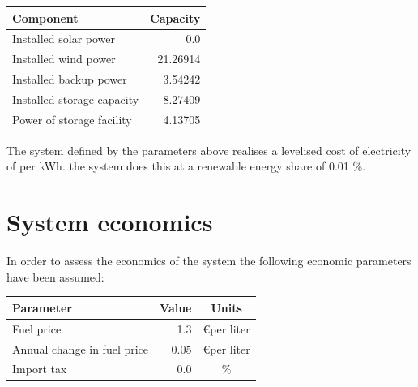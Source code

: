 \documentclass{article}
\begin{document}
\begin{multicols*}{2}
\begin{center}

\begin{tabular}{|l|r|}

\hline Component&Capacity\\ \hline 

Installed solar power&0.0\\ 

Installed wind power&21.26914\\ 

Installed backup power&3.54242\\ 

Installed storage capacity&8.27409\\ 

Power of storage facility&4.13705\\ 

\hline

\end{tabular}

\label{tab:systemlayout}

\end{center}


\vspace{2.5mm}

The system defined by the parameters above realises a levelised cost of electricity of  per kWh. the system does this at a renewable energy share of 0.01 \%. 

\section*{System economics}

In order to assess the economics of the system the following economic parameters have been assumed: 

\begin{center}

\begin{tabular}{|l|r|c|}

\hline Parameter&Value&Units\\ \hline 

Fuel price&1.3&\euro per liter\\ 

Annual change in fuel price&0.05&\euro per liter\\ 

Import tax&0.0&\%\\ 


\end{tabular}
\end{center}
\end{multicols*}
\end{document}
